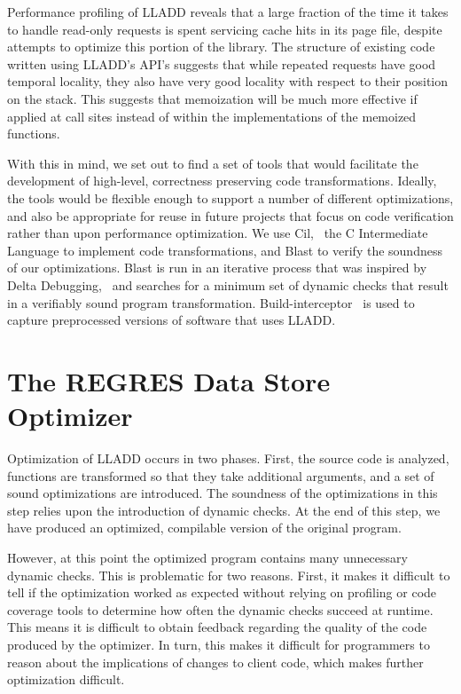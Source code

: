\documentclass[10pt,letterpaper,twocolumn,english]{article}
\newcommand{\yad}{LLADD\xspace}
\begin{document}
Performance profiling of \yad reveals that a large fraction of the time it
takes to handle read-only requests is spent servicing cache hits in
its page file, despite attempts to optimize this portion of the
library.  The structure of existing code written using \yad's API's
suggests that while repeated requests have good temporal locality,
they also have very good locality with respect to their position on
the stack.  This suggests that memoization will be much more effective
if applied at call sites instead of within the implementations of the
memoized functions.

With this in mind, we set out to find a set of tools that would
facilitate the development of high-level, correctness preserving code
transformations.  Ideally, the tools would be flexible enough to
support a number of different optimizations, and also be appropriate
for reuse in future projects that focus on code verification rather
than upon performance optimization.  We use Cil,~\cite{cil} the C Intermediate
Language to implement code transformations, and Blast to verify the
soundness of our optimizations.  Blast is run in an iterative process
that was inspired by Delta Debugging,~\cite{deltaDebugging} and searches for a minimum set
of dynamic checks that result in a verifiably sound program
transformation.  Build-interceptor~\cite{buildInterceptor} is used to capture preprocessed
versions of software that uses \yad.


\section{The REGRES Data Store Optimizer}

Optimization of \yad occurs in two phases.  First, the source code is
analyzed, functions are transformed so that they take additional
arguments, and a set of sound optimizations are introduced.  The
soundness of the optimizations in this step relies upon the
introduction of dynamic checks.  At the end of this step, we have produced an
optimized, compilable version of the original program.

However, at this point the optimized program contains many unnecessary dynamic checks.
  This is problematic for two
reasons.  First, it makes it difficult to tell if the optimization
worked as expected without relying on profiling or code coverage tools
to determine how often the dynamic checks succeed at runtime.  This
means it is difficult to obtain feedback regarding the
quality of the code produced by the optimizer.  In turn, this makes it
difficult for programmers to reason about the implications of changes
to client code, which makes further optimization difficult.  
\end{document}
